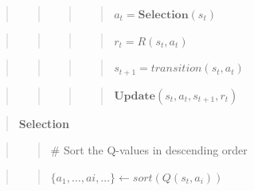 \documentclass[10pt,a4paper,onecolumn]{article}
\begin{document}
\begin{quote}
\begin{quote}
\begin{quote}
\begin{quote}
\(a_t = \textbf{Selection}(s_t)\)
\end{quote}
\end{quote}
\end{quote}
\end{quote}

\begin{quote}
\begin{quote}
\begin{quote}
\begin{quote}
\(r_t = R(s_t,a_t)\)
\end{quote}
\end{quote}
\end{quote}
\end{quote}

\begin{quote}
\begin{quote}
\begin{quote}
\begin{quote}
\(s_{t+1} = transition(s_t, a_t)\)
\end{quote}
\end{quote}
\end{quote}
\end{quote}

\begin{quote}
\begin{quote}
\begin{quote}
\begin{quote}
\(\textbf{Update}(s_t,a_t, s_{t+1}, r_t)\)
\end{quote}
\end{quote}
\end{quote}
\end{quote}

\begin{quote}
\textbf{Selection}
\end{quote}

\begin{quote}
\begin{quote}
\(\#\) Sort the Q-values in descending order
\end{quote}
\end{quote}

\begin{quote}
\begin{quote}
\(\{a_1,\ldots,ai,\ldots\} \leftarrow sort(Q(s_t,a_i))\)
\end{quote}
\end{quote}
\end{document}
